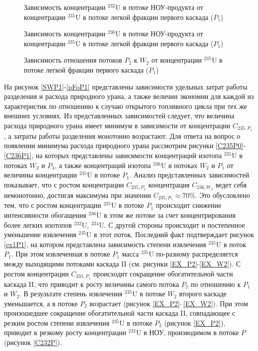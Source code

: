 \begin{figure}[ht]
  \centering
  \begin{minipage}{.5\textwidth}
    \centering
    
    \caption{{Зависимость концентрации $^{232}$U в потоке НОУ-продукта от концентрации $^{235}$U в потоке легкой фракции первого каскада ($P_1$){\label{C232P}}}}
  \end{minipage}%
  \begin{minipage}{.5\textwidth}
    \centering
    
    \caption{{Зависимость концентрации $^{236}$U в потоке НОУ-продукта от концентрации $^{235}$U в потоке легкой фракции первого каскада ($P_1$){\label{C236P}}}}
\end{minipage}
\end{figure}

\begin{figure}[ht]
    \centering
      
    \caption{Зависимость отношения потоков $P_2$ к $W_2$ от концентрации $^{235}$U в потоке легкой фракции первого каскада ($P_1$)}\label{P2W2}
\end{figure}

На рисунок \ref{SWP1}-\ref{pFoP1} представлены зависимости удельных затрат работы разделения и расхода природного урана, а также величин экономии для каждой из характеристик по отношению к случаю открытого топливного цикла при тех же внешних условиях. Из представленных зависимостей следует, что величина расхода природного урана имеет минимум в зависимости от концентрации $C_{235,{P_1}}$, а затраты работы разделения монотонно возрастают. Для ответа на вопрос о появлении минимума расхода природного урана рассмотрим рисунки \ref{C235P0}-\ref{C236P1}, на которых представлены зависимости концентраций изотопа $^{235}$U в потоках $W_2$ и $P_3$, а также концентраций изотопа $^{236}$U в потоках $W_2$ и $P_1$ от величины концентрации $^{235}$U в потоке $P_1$. Анализ представленных зависимостей показывает, что с ростом концентрации $C_{235,{P_1}}$ концентрация $C_{236,{W_2}}$ ведет себя немонотонно, достигая максимума при значении $C_{235,{P_1}} \approx 70\%$. Это обусловлено тем, что с ростом концентрации $^{235}$U в потоке $P_1$ происходит снижение интенсивности обогащения $^{236}$U в этом же потоке за счет концентрирования более легких изотопов $^{232}$U, $^{234}$U. С другой стороны происходит и постепенное уменьшение извлечения $^{235}$U в этот поток. Последний факт подтверждает рисунок \ref{ex1P1}, на котором представлена зависимость степени извлечения $^{235}$U в поток $P_1$. При этом извлеченная в потоке $P_1$ масса $^{235}$U по-разному распределяется между выходящими потоками каскада II (см. рисунки \ref{EX_P2}-\ref{EX_W2}).
С ростом концентрации $C_{235,{P_1}}$ происходит сокращение обогатительной части каскада II, что приводит к росту величины самого потока $P_2$ по отношению к $P_1$ и $W_2$.
В результате степень извлечения $^{235}$U в потоке $W_2$ второго каскаде уменьшается, а в потоке $P_2$ возрастает (рисунок \ref{EX_P2}--\ref{EX_W2}). При этом произошедшее сокращение обогатительной части каскада II, совпадающее с резким ростом степени извлечения $^{235}$U в потоке $P_2$ (рисунок \ref{EX_P2}), приводит к резкому росту концентрации $^{232}$U в НОУ, производимом в потоке $P$ (рисунок \ref{C232P}).

